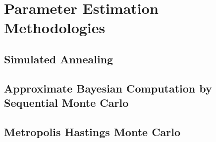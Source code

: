 \chapter{Parameter Estimation Methodologies}
\section{Simulated Annealing}
\section{Approximate Bayesian Computation by Sequential Monte Carlo}
\section{Metropolis Hastings Monte Carlo}